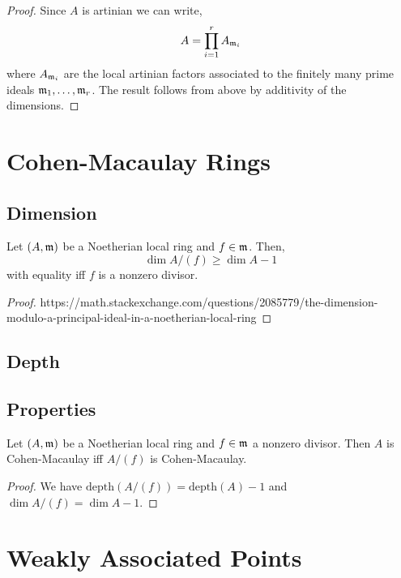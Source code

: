 \documentclass[12pt]{article}
\begin{document}
\begin{proof}
Since $A$ is artinian we can write,
\[ A = \prod_{i = 1}^r A_{\mathfrak{m}_i} \]
where $A_{\mathfrak{m}_i}$ are the local artinian factors associated to the finitely many prime ideals $\mathfrak{m}_1, \dots, \mathfrak{m}_r$. The result follows from above by additivity of the dimensions.
\end{proof}

\section{Cohen-Macaulay Rings}

\subsection{Dimension}

\begin{prop}
Let $(A, \mathfrak{m})$ be a Noetherian local ring and $f \in \mathfrak{m}$. Then,
\[ \dim{A/(f)} \ge \dim{A} - 1 \]
with equality iff $f$ is a nonzero divisor.
\end{prop}

\begin{proof}
https://math.stackexchange.com/questions/2085779/the-dimension-modulo-a-principal-ideal-in-a-noetherian-local-ring
\end{proof}

\subsection{Depth}

\newcommand{\depth}[1]{\mathrm{depth}\left( #1 \right)}

\subsection{Properties}

\begin{prop}
Let $(A, \mathfrak{m})$ be a Noetherian local ring and $f \in \mathfrak{m}$ a nonzero divisor. Then $A$ is Cohen-Macaulay iff $A / (f)$ is Cohen-Macaulay.
\end{prop}

\begin{proof}
We have $\depth{A/(f)} = \depth{A} - 1$ and $\dim{A/(f)} = \dim{A} - 1$.
\end{proof}


\section{Weakly Associated Points}
\end{document}
